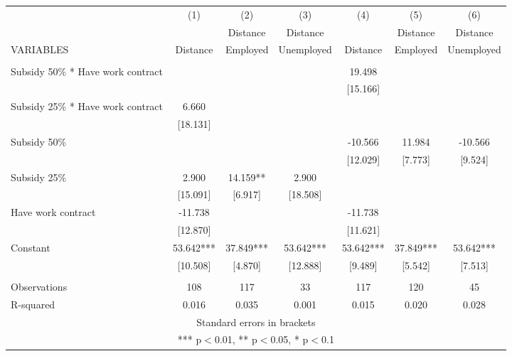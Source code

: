 \begin{tabular}{lcccccc} \hline
 & (1) & (2) & (3) & (4) & (5) & (6) \\
 &  & Distance & Distance &  & Distance & Distance \\
VARIABLES & Distance & Employed & Unemployed & Distance & Employed & Unemployed \\ \hline
 &  &  &  &  &  &  \\
Subsidy 50\% * Have work contract &  &  &  & 19.498 &  &  \\
 &  &  &  & [15.166] &  &  \\
Subsidy 25\% * Have work contract & 6.660 &  &  &  &  &  \\
 & [18.131] &  &  &  &  &  \\
Subsidy 50\% &  &  &  & -10.566 & 11.984 & -10.566 \\
 &  &  &  & [12.029] & [7.773] & [9.524] \\
Subsidy 25\% & 2.900 & 14.159** & 2.900 &  &  &  \\
 & [15.091] & [6.917] & [18.508] &  &  &  \\
Have work contract & -11.738 &  &  & -11.738 &  &  \\
 & [12.870] &  &  & [11.621] &  &  \\
Constant & 53.642*** & 37.849*** & 53.642*** & 53.642*** & 37.849*** & 53.642*** \\
 & [10.508] & [4.870] & [12.888] & [9.489] & [5.542] & [7.513] \\
 &  &  &  &  &  &  \\
Observations & 108 & 117 & 33 & 117 & 120 & 45 \\
 R-squared & 0.016 & 0.035 & 0.001 & 0.015 & 0.020 & 0.028 \\ \hline
\multicolumn{7}{c}{ Standard errors in brackets} \\
\multicolumn{7}{c}{ *** p$<$0.01, ** p$<$0.05, * p$<$0.1} \\
\end{tabular}
